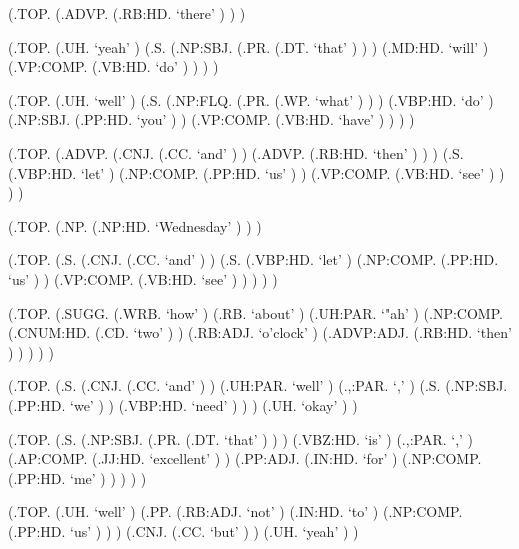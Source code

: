 \documentclass[10pt]{article}
\begin{document}
\begin{parsetree}  (.TOP. (.ADVP. (.RB:HD. `there' ) ) ) \end{parsetree}

\begin{parsetree}  (.TOP. (.UH. `yeah' ) (.S. (.NP:SBJ. (.PR. (.DT. `that' ) ) ) (.MD:HD. `will' ) (.VP:COMP. (.VB:HD. `do' ) ) ) ) \end{parsetree}

\begin{parsetree}  (.TOP. (.UH. `well' ) (.S. (.NP:FLQ. (.PR. (.WP. `what' ) ) ) (.VBP:HD. `do' ) (.NP:SBJ. (.PP:HD. `you' ) ) (.VP:COMP. (.VB:HD. `have' ) ) ) ) \end{parsetree}

\begin{parsetree}  (.TOP. (.ADVP. (.CNJ. (.CC. `and' ) ) (.ADVP. (.RB:HD. `then' ) ) ) (.S. (.VBP:HD. `let' ) (.NP:COMP. (.PP:HD. `us' ) ) (.VP:COMP. (.VB:HD. `see' ) ) ) ) \end{parsetree}

\begin{parsetree}  (.TOP. (.NP. (.NP:HD. `Wednesday' ) ) ) \end{parsetree}

\begin{parsetree}  (.TOP. (.S. (.CNJ. (.CC. `and' ) ) (.S. (.VBP:HD. `let' ) (.NP:COMP. (.PP:HD. `us' ) ) (.VP:COMP. (.VB:HD. `see' ) ) ) ) ) \end{parsetree}

\begin{parsetree}  (.TOP. (.SUGG. (.WRB. `how' ) (.RB. `about' ) (.UH:PAR. `"ah' ) (.NP:COMP. (.CNUM:HD. (.CD. `two' ) ) (.RB:ADJ. `o'clock' ) (.ADVP:ADJ. (.RB:HD. `then' ) ) ) ) ) \end{parsetree}

\begin{parsetree}  (.TOP. (.S. (.CNJ. (.CC. `and' ) ) (.UH:PAR. `well' ) (.,:PAR. `,' ) (.S. (.NP:SBJ. (.PP:HD. `we' ) ) (.VBP:HD. `need' ) ) ) (.UH. `okay' ) ) \end{parsetree}

\begin{parsetree}  (.TOP. (.S. (.NP:SBJ. (.PR. (.DT. `that' ) ) ) (.VBZ:HD. `is' ) (.,:PAR. `,' ) (.AP:COMP. (.JJ:HD. `excellent' ) ) (.PP:ADJ. (.IN:HD. `for' ) (.NP:COMP. (.PP:HD. `me' ) ) ) ) ) \end{parsetree}

\begin{parsetree}  (.TOP. (.UH. `well' ) (.PP. (.RB:ADJ. `not' ) (.IN:HD. `to' ) (.NP:COMP. (.PP:HD. `us' ) ) ) (.CNJ. (.CC. `but' ) ) (.UH. `yeah' ) ) \end{parsetree}
\end{document}
